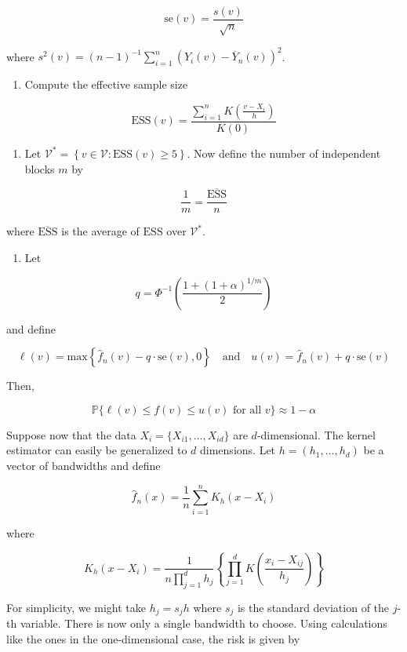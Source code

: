 \[ \text{se}(v) = \frac{s(v)}{\sqrt{n}} \]

where
\(s^2(v) = (n - 1)^{-1} \sum_{i=1}^n ( Y_i(v) - \overline{Y}_n(v) )^2\).

\begin{enumerate}[tightlist,label={\arabic*.},resume]
\item
  Compute the effective sample size
\end{enumerate}

\[ \text{ESS}(v) = \frac{\sum_{i=1}^n K\left( \frac{v - X_i}{h} \right)}{K(0)} \]

\begin{enumerate}[tightlist,label={\arabic*.},resume]
\item
  Let
  \(\mathcal{V}^* = \left\{ v \in \mathcal{V} : \text{ESS}(v) \geq 5 \right\}\).
  Now define the number of independent blocks \(m\) by
\end{enumerate}

\[ \frac{1}{m} = \frac{\overline{\text{ESS}}}{n} \]

where \(\overline{\text{ESS}}\) is the average of \(\text{ESS}\) over
\(\mathcal{V}^*\).

\begin{enumerate}[tightlist,label={\arabic*.},resume]
\item
  Let
\end{enumerate}

\[ q = \Phi^{-1} \left( \frac{1 + (1 + \alpha)^{1/m}}{2} \right) \]

and define

\[ \ell(v) = \text{max} \left\{ \hat{f}_n(v) - q \cdot \text{se}(v), 0 \right\}
\quad \text{and} \quad
u(v) = \hat{f}_n(v) + q \cdot \text{se}(v)\]

Then,

\[ \mathbb{P} \Big\{ \ell(v) \leq f(v) \leq u(v) \text{ for all } v \Big\} \approx 1 - \alpha \]

Suppose now that the data \(X_i = \{ X_{i1}, \dots, X_{id} \}\) are
\(d\)-dimensional. The kernel estimator can easily be generalized to
\(d\) dimensions. Let \(h = (h_1, \dots, h_d)\) be a vector of
bandwidths and define

\[ \hat{f}_n(x) = \frac{1}{n} \sum_{i=1}^n K_h(x - X_i) \]

where

\[ K_h(x - X_i) = \frac{1}{n \prod_{j=1}^d h_j} \left\{ \prod_{j=1}^d K \left( \frac{x_i - X_{ij}}{h_j} \right) \right\} \]

For simplicity, we might take \(h_j = s_j h\) where \(s_j\) is the
standard deviation of the \(j\)-th variable. There is now only a single
bandwidth to choose. Using calculations like the ones in the
one-dimensional case, the risk is given by

